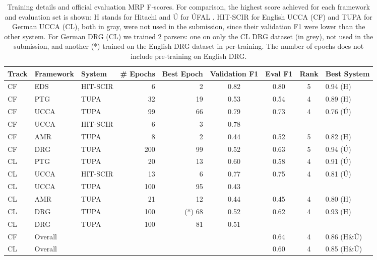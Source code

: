 \documentclass[11pt,a4paper]{article}
\begin{document}
\begin{table*}[t]\centering\setlength{\tabcolsep}{3pt}
\begin{tabular}{lllrrcccl}
\multicolumn{1}{l}{\textbf{Track}} &
  \multicolumn{1}{l}{\textbf{Framework}} &
  \multicolumn{1}{l}{\textbf{System}} &
  \multicolumn{1}{l}{\textbf{\# Epochs}} &
  \multicolumn{1}{l}{\textbf{Best Epoch}} &
  \multicolumn{1}{l}{\textbf{Validation F1}} &
  \multicolumn{1}{l}{\textbf{Eval F1}} &
  \multicolumn{1}{l}{\textbf{Rank}} &
  \textbf{Best System} \\ \hline
CF & EDS     & HIT-SCIR & 6    & 2   & 0.82 & 0.80 & 5 & 0.94 (H) \\
CF & PTG     & TUPA     & 32   & 19  & 0.53 & 0.54 & 4 & 0.89 (H) \\
CF & UCCA    & TUPA     & 99   & 66  & 0.79 & 0.73 & 4 & 0.76 (Ú)    \\
\color{gray} CF & \color{gray}  UCCA    & \color{gray} HIT-SCIR      & \color{gray} 6   & \color{gray} 3  & \color{gray} 0.78 &&&  \\
CF & AMR     & TUPA     & 8    & 2   & 0.44 & 0.52 & 5 & 0.82 (H) \\
CF & DRG     & TUPA     & 200  & 99  & 0.52 & 0.63 & 5 & 0.94 (Ú)    \\
CL & PTG     & TUPA     & 20   & 13  & 0.60 & 0.58 & 4 & 0.91 (Ú)    \\
CL & UCCA    & HIT-SCIR & 13   & 6   & 0.77 & 0.75 & 4 & 0.81 (Ú)    \\
\color{gray} CL & \color{gray}  UCCA    & \color{gray} TUPA      & \color{gray} 100   & \color{gray} 95  & \color{gray} 0.43 &&&  \\
CL & AMR     & TUPA     & 21   & 12  & 0.44 & 0.45 & 4 & 0.80 (H) \\
CL & DRG     & TUPA     & 100 & (*) 68 & 0.52 & 0.62 & 4 & 0.93 (H) \\
\color{gray} CL & \color{gray} DRG     & \color{gray}TUPA     & \color{gray} 100 & \color{gray} 81 & \color{gray}0.51 &&&  \\ \hline
CF & Overall &          &      &     &       & 0.64 & 4 & 0.86 (H\&Ú)  \\
CL & Overall &          &      &     &       & 0.60 & 4 & 0.85 (H\&Ú)
\end{tabular}
\caption{Training details and official evaluation MRP F-scores.
For comparison, the highest score achieved for each framework and evaluation set is shown: H stands for Hitachi \cite{Oza:Mor:Kor:20} and Ú for ÚFAL \cite{Na:Min:20}. HIT-SCIR for English UCCA (CF) and TUPA for German UCCA (CL), both in gray, were not used in the submission, since their validation F1 were lower than the other system. For German DRG (CL) we trained 2 parsers: one on only the CL DRG dataset (in grey), not used in the submission, and another (*) trained on the English DRG dataset in per-training. The number of epochs does not include pre-training on English DRG.
\label{tab:official}}
\end{table*}
\end{document}
